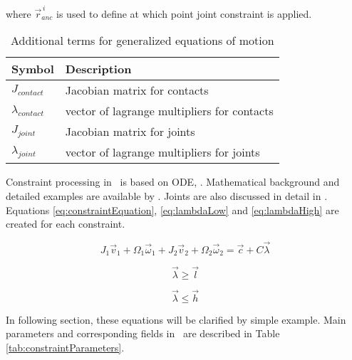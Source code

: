 where $\vec{r}_{anc}^{\,i}$ is used to define at which point
joint constraint is applied.

\begin {table}[htb!]
\caption {Additional terms  for generalized equations of motion}
\label{tab:eom-g}
\begin{center}
\begin{tabular}{|l| l|}
\hline
{\bf Symbol} & {\bf Description} \\  \hline
$J_{contact}$ & Jacobian matrix for contacts  \\ \hline
$\lambda_{contact}$ & vector of lagrange multipliers for contacts  \\ \hline
$J_{joint}$ & Jacobian matrix for joints  \\ \hline
$\lambda_{joint}$ & vector of lagrange multipliers for joints  \\ \hline
\end {tabular}
\end{center}
\end {table}

Constraint processing in \bullet\ is based on ODE, \cite{ode}.
Mathematical background and detailed examples are available by \cite{ode.joints}.
Joints are also discussed in detail in  
\citet{erleben.thesis}.
Equations \ref{eq:constraintEquation}, \ref{eq:lambdaLow} and
\ref{eq:lambdaHigh} 
are created for each constraint.

\begin{equation} \label{eq:constraintEquation}
J_1 \vec{v}_1 + \Omega_1 \vec{\omega}_1 + 
J_2 \vec{v}_2 + \Omega_2 \vec{\omega}_2 = \vec{c} + C \vec{\lambda}
\end{equation}

\begin{equation} \label{eq:lambdaLow}
\vec{\lambda} \geq \vec{l}
\end{equation}

\begin{equation} \label{eq:lambdaHigh}
\vec{\lambda} \leq \vec{h}
\end{equation}

In following section, these equations will be clarified by simple example.
Main parameters  and corresponding fields in \bullet\  
 are described in Table \ref{tab:constraintParameters}.

